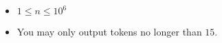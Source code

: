 \begin{itemize}
	\tightlist
	\item $1 \le n \le 10^6$
	\item You may only output tokens no longer than $15$.
\end{itemize}

